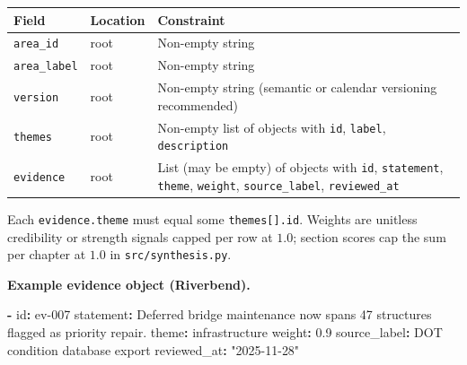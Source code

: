 \documentclass[
]{article}
\newenvironment{Shaded}{}{}
\newcommand{\AttributeTok}[1]{\textcolor[rgb]{0.49,0.56,0.16}{#1}}
\newcommand{\FloatTok}[1]{\textcolor[rgb]{0.25,0.63,0.44}{#1}}
\newcommand{\FunctionTok}[1]{\textcolor[rgb]{0.02,0.16,0.49}{#1}}
\newcommand{\KeywordTok}[1]{\textcolor[rgb]{0.00,0.44,0.13}{\textbf{#1}}}
\newcommand{\StringTok}[1]{\textcolor[rgb]{0.25,0.44,0.63}{#1}}
\newcounter{none} %
\begin{document}
{\def\LTcaptype{none} %
\begin{longtable}[]{@{}
  >{\raggedright\arraybackslash}p{}
  >{\raggedright\arraybackslash}p{}
  >{\raggedright\arraybackslash}p{}@{}}
\toprule\noalign{}
\begin{minipage}[b]{\linewidth}\raggedright
Field
\end{minipage} & \begin{minipage}[b]{\linewidth}\raggedright
Location
\end{minipage} & \begin{minipage}[b]{\linewidth}\raggedright
Constraint
\end{minipage} \\
\midrule\noalign{}
\endhead
\bottomrule\noalign{}
\endlastfoot
\texttt{area\_id} & root & Non-empty string \\
\texttt{area\_label} & root & Non-empty string \\
\texttt{version} & root & Non-empty string (semantic or calendar
versioning recommended) \\
\texttt{themes} & root & Non-empty list of objects with \texttt{id},
\texttt{label}, \texttt{description} \\
\texttt{evidence} & root & List (may be empty) of objects with
\texttt{id}, \texttt{statement}, \texttt{theme}, \texttt{weight},
\texttt{source\_label}, \texttt{reviewed\_at} \\
\end{longtable}
}

Each \texttt{evidence.theme} must equal some \texttt{themes{[}{]}.id}.
Weights are unitless credibility or strength signals capped per row at
\(1.0\); section scores cap the sum per chapter at \(1.0\) in
\texttt{src/synthesis.py}.

\textbf{Example evidence object (Riverbend).}

\begin{Shaded}
\begin{Highlighting}[]
\KeywordTok{{-}}\AttributeTok{ }\FunctionTok{id}\KeywordTok{:}\AttributeTok{ ev{-}007}
\AttributeTok{  }\FunctionTok{statement}\KeywordTok{:}\AttributeTok{ Deferred bridge maintenance now spans 47 structures flagged as priority repair.}
\AttributeTok{  }\FunctionTok{theme}\KeywordTok{:}\AttributeTok{ infrastructure}
\AttributeTok{  }\FunctionTok{weight}\KeywordTok{:}\AttributeTok{ }\FloatTok{0.9}
\AttributeTok{  }\FunctionTok{source\_label}\KeywordTok{:}\AttributeTok{ DOT condition database export}
\AttributeTok{  }\FunctionTok{reviewed\_at}\KeywordTok{:}\AttributeTok{ }\StringTok{"2025{-}11{-}28"}
\end{Highlighting}
\end{Shaded}
\end{document}
